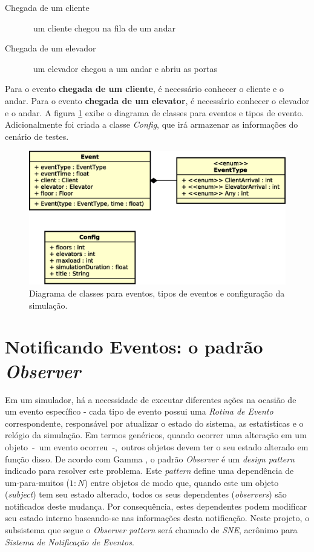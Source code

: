 \begin{description}
  \item[Chegada de um cliente] \hfill \ um cliente chegou na fila de um andar
  \item[Chegada de um elevador] \hfill \ um elevador chegou a um andar e abriu as portas
\end{description}

Para o evento \textbf{chegada de um cliente}, é necessário conhecer o cliente e
o andar. Para o evento \textbf{chegada de um elevator}, é necessário conhecer o
elevador e o andar. A figura \ref{fig:diagram:event} exibe o diagrama de classes
para eventos e tipos de evento. Adicionalmente foi criada a classe
\textit{Config}, que irá armazenar as informações do cenário de testes.

\begin{figure}[htb!]
  \centering
  \includegraphics[scale=0.6]{img/Basic.eps}
  \caption{Diagrama de classes para eventos, tipos de eventos e configuração da simulação.}
\label{fig:diagram:event}
\end{figure}

\section{\label{sec:model:notify}Notificando Eventos: o padrão
\textit{Observer}}

Em um simulador, há a necessidade de executar diferentes ações na ocasião de um
evento específico - cada tipo de evento possui uma \textit{Rotina de Evento}
correspondente, responsável por atualizar o estado do sistema, as estatísticas e
o relógio da simulação. Em termos genéricos, quando ocorrer uma alteração em um
objeto~-~um evento ocorreu~-,~outros objetos devem ter o seu estado alterado em
função disso. De acordo com Gamma \cite{Gamma:1995:DPE:186897}, o padrão
\textit{Observer} é um \textit{design pattern} indicado para resolver este
problema. Este \textit{pattern} define uma dependência de um-para-muitos ($1:N$)
entre objetos de modo que, quando este um objeto (\textit{subject}) tem seu
estado alterado, todos os seus dependentes (\textit{observers}) são notificados
deste mudança. Por consequência, estes dependentes podem modificar seu estado
interno baseando-se nas informações desta notificação. Neste projeto, o
subsistema que segue o \textit{Observer pattern} será chamado de \textit{SNE},
acrônimo para \textit{Sistema de Notificação de Eventos}.


